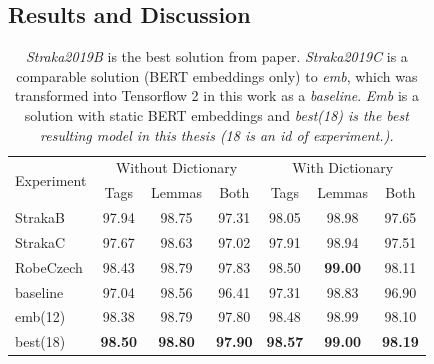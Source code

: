 \subsection{Results and Discussion}

\begin{table}[!h]
  \begin{tabular}{|l||ccc||ccc|}
  \hline
\multirow{2}{*}{Experiment} & \multicolumn{3}{c||}{Without Dictionary}  &
      \multicolumn{3}{c|}{With Dictionary} \\ 
    & Tags & Lemmas & Both & Tags & Lemmas & Both \\ \hline \hline
    StrakaB & 97.94 & 98.75 & 97.31 & 98.05 & 98.98 & 97.65 \\ \hline
    StrakaC & 97.67 & 98.63 & 97.02 & 97.91 & 98.94 & 97.51 \\ \hline
     RobeCzech & 98.43 & 98.79  & 97.83  & 98.50 & \textbf{99.00}  & 98.11 \\ \hline \hline
      baseline & 97.04  & 98.56  & 96.41 &  97.31   & 98.83  & 96.90 \\ \hline 
    emb(12) & 98.38  &98.79  & 97.80 & 98.48  & 98.99 & 98.10 \\ \hline
    best(18) & \textbf{98.50}  & \textbf{98.80} &\textbf{ 97.90}  & \textbf{98.57}  & \textbf{99.00}  & \textbf{98.19}  \\ \hline  
  \end{tabular}
  \caption{%
  \textit{Straka2019B} is the best solution from \citep{Straka2019} paper. \textit{Straka2019C} is a comparable solution  (BERT embeddings only) to \textit{emb}, which was transformed into Tensorflow 2 in this work as a \textit{baseline}. \textit{Emb} is a solution with static BERT embeddings and \textit{best(18) is the best resulting model in this thesis (18 is an id of experiment.). }} 
\end{table}


